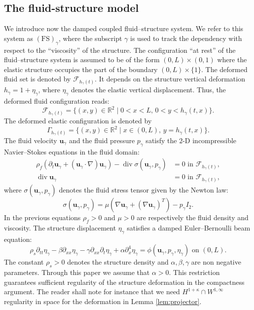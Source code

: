 \documentclass[JEP,XML,SOM,Unicode,NoFloatCountersInSection]{cedram}
\let\mathcal\mathscr
\newcommand{\FS}{\mathrm{FS}}
\theoremstyle{remark}
\theoremstyle{definition}
\newcommand{\Real}{\mathbb{R}}
\newcommand{\ug}{\boldsymbol{u}}
\DeclareMathOperator{\DIV}{div}
\begin{document}
\subsection{The fluid-structure model}
We introduce now the damped coupled fluid--structure system. We refer to
this system as $(\FS)_{\gamma}$, where the subscript $\gamma$ is used to track the dependency with respect to the ``viscosity'' of the structure. The configuration ``at rest'' of the fluid--structure system is assumed to be of the form $(0, L)\times (0, 1)$ where the elastic structure occupies the part of the boundary $(0, L)\times \{1\}$. The deformed fluid set is denoted by $\mathcal{F}_{h_{\gamma}(t)}$. It depends on the structure vertical deformation $h_{\gamma}=1+\eta_\gamma$, where $\eta_\gamma$ denotes the elastic vertical displacement.
Thus, the deformed fluid configuration reads:\vspace*{-3pt}\enlargethispage{.5\baselineskip}%
\begin{equation}\label{fluid.domain}
\mathcal{F}_{h_{\gamma}(t)}=\{(x,y)\in\mathbb{R}^{2}\mid 0<x<L,\,0<y<h_{\gamma}(t,x)\}.
\end{equation}
The deformed elastic configuration is denoted by
\[
\Gamma_{h_{\gamma}(t)}=\{(x,y)\in\Real^{2}\mid x\in(0,L),\,y=h_{\gamma}(t,x)\}.
\]
The fluid velocity $\ug_{\gamma}$ and the fluid pressure $p_{\gamma}$ satisfy the $2$-D incompressible Navier--Stokes equations in the fluid domain:
\begin{equation}\label{Navier-Stokes}
\begin{aligned}
\rho_{f}(\partial_{t}\ug_{\gamma} + (\ug_{\gamma}\cdot\nabla)\ug_{\gamma}) - \DIV{\sigma(\ug_{\gamma},p_{\gamma})} &{}= 0\text{ in }\mathcal{F}_{h_{\gamma}(t)},\\
\DIV{\ug_{\gamma}}&{}=0\text{ in }\mathcal{F}_{h_{\gamma}(t)},
\end{aligned}
\end{equation}
where $\sigma(\ug_{\gamma},p_{\gamma})$ denotes the fluid stress tensor given by the Newton law:
\[\sigma(\ug_{\gamma},p_{\gamma})=\mu(\nabla\ug_{\gamma} +( \nabla\ug_{\gamma})^{T}) -p_{\gamma}I_{2}.\]
In the previous equations $\rho_{f}>0$ and $\mu>0$ are respectively the fluid density and viscosity. The structure displacement $\eta_{\gamma}$ satisfies a damped Euler--Bernoulli beam equation:\vspace*{-3pt}
\begin{equation}\label{Beam.equation}
\rho_{s}\partial_{tt}\eta_{\gamma}-\beta\partial_{xx}\eta_{\gamma}-\gamma\partial_{xx}\partial_{t}\eta_{\gamma}+\alpha\partial_{x}^4\eta_{\gamma}=\phi(\ug_{\gamma},p_{\gamma},\eta_{\gamma})\text{ on }(0,L).
\end{equation}
The constant $\rho_{s}>0$ denotes the structure density and $\alpha,\beta,\gamma$ are non negative parameters.
Through this paper we assume that $\alpha>0$.
This restriction guarantees sufficient regularity of the structure deformation in the compactness argument. The reader shall note for instance that we need $H^{1+\kappa} \cap W^{1,\infty}$ regularity in space for the deformation in Lemma \ref{lem:projector}.
\end{document}
